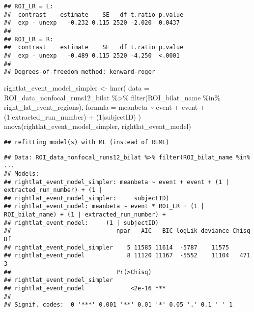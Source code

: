 \documentclass[
]{article}
\newenvironment{Shaded}{\begin{snugshade}}{\end{snugshade}}
\newcommand{\AttributeTok}[1]{\textcolor[rgb]{0.77,0.63,0.00}{#1}}
\newcommand{\DecValTok}[1]{\textcolor[rgb]{0.00,0.00,0.81}{#1}}
\newcommand{\FunctionTok}[1]{\textcolor[rgb]{0.00,0.00,0.00}{#1}}
\newcommand{\NormalTok}[1]{#1}
\newcommand{\OtherTok}[1]{\textcolor[rgb]{0.56,0.35,0.01}{#1}}
\newcommand{\SpecialCharTok}[1]{\textcolor[rgb]{0.00,0.00,0.00}{#1}}
\begin{document}
\begin{verbatim}
## ROI_LR = L:
##  contrast    estimate    SE   df t.ratio p.value
##  exp - unexp   -0.232 0.115 2520 -2.020  0.0437 
## 
## ROI_LR = R:
##  contrast    estimate    SE   df t.ratio p.value
##  exp - unexp   -0.489 0.115 2520 -4.250  <.0001 
## 
## Degrees-of-freedom method: kenward-roger
\end{verbatim}

\begin{Shaded}
\begin{Highlighting}[]
\NormalTok{rightlat\_event\_model\_simpler }\OtherTok{\textless{}{-}} \FunctionTok{lmer}\NormalTok{(}
      \AttributeTok{data =}\NormalTok{ ROI\_data\_nonfocal\_runs12\_bilat }\SpecialCharTok{\%\textgreater{}\%}
        \FunctionTok{filter}\NormalTok{(ROI\_bilat\_name }\SpecialCharTok{\%in\%}\NormalTok{ right\_lat\_event\_regions),}
      \AttributeTok{formula =}\NormalTok{ meanbeta }\SpecialCharTok{\textasciitilde{}}\NormalTok{ event }\SpecialCharTok{+}\NormalTok{ event }\SpecialCharTok{+}\NormalTok{ (}\DecValTok{1}\SpecialCharTok{|}\NormalTok{extracted\_run\_number) }\SpecialCharTok{+}\NormalTok{ (}\DecValTok{1}\SpecialCharTok{|}\NormalTok{subjectID)}
\NormalTok{    )}
\FunctionTok{anova}\NormalTok{(rightlat\_event\_model\_simpler, rightlat\_event\_model)}
\end{Highlighting}
\end{Shaded}

\begin{verbatim}
## refitting model(s) with ML (instead of REML)
\end{verbatim}

\begin{verbatim}
## Data: ROI_data_nonfocal_runs12_bilat %>% filter(ROI_bilat_name %in%  ...
## Models:
## rightlat_event_model_simpler: meanbeta ~ event + event + (1 | extracted_run_number) + (1 | 
## rightlat_event_model_simpler:     subjectID)
## rightlat_event_model: meanbeta ~ event * ROI_LR + (1 | ROI_bilat_name) + (1 | extracted_run_number) + 
## rightlat_event_model:     (1 | subjectID)
##                              npar   AIC   BIC logLik deviance Chisq Df
## rightlat_event_model_simpler    5 11585 11614  -5787    11575         
## rightlat_event_model            8 11120 11167  -5552    11104   471  3
##                              Pr(>Chisq)    
## rightlat_event_model_simpler               
## rightlat_event_model             <2e-16 ***
## ---
## Signif. codes:  0 '***' 0.001 '**' 0.01 '*' 0.05 '.' 0.1 ' ' 1
\end{verbatim}
\end{document}
